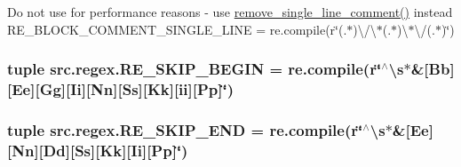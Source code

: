 Do not use for performance reasons -\/ use \hyperlink{namespacesrc_1_1utils_aeb934e59b76906b5837a00557f0ef750}{remove\-\_\-single\-\_\-line\-\_\-comment()} instead R\-E\-\_\-\-B\-L\-O\-C\-K\-\_\-\-C\-O\-M\-M\-E\-N\-T\-\_\-\-S\-I\-N\-G\-L\-E\-\_\-\-L\-I\-N\-E = re.\-compile(r\char`\"{}(.$\ast$)\textbackslash{}/\textbackslash{}$\ast$(.$\ast$)\textbackslash{}$\ast$\textbackslash{}/(.$\ast$)\char`\"{}) 

\hypertarget{namespacesrc_1_1regex_a607f21c9159f5e50832b5c458cce7c80}{
\subsubsection[{R\-E\-\_\-\-S\-K\-I\-P\-\_\-\-B\-E\-G\-I\-N}]{\setlength{\rightskip}{0pt plus 5cm}tuple src.\-regex.\-R\-E\-\_\-\-S\-K\-I\-P\-\_\-\-B\-E\-G\-I\-N = re.\-compile(r\char`\"{}$^\wedge$\textbackslash{}s$\ast$\&\mbox{[}Bb\mbox{]}\mbox{[}Ee\mbox{]}\mbox{[}Gg\mbox{]}\mbox{[}Ii\mbox{]}\mbox{[}Nn\mbox{]}\mbox{[}Ss\mbox{]}\mbox{[}Kk\mbox{]}\mbox{[}ii\mbox{]}\mbox{[}Pp\mbox{]}\char`\"{})}}\label{namespacesrc_1_1regex_a607f21c9159f5e50832b5c458cce7c80}
\hypertarget{namespacesrc_1_1regex_a431bcb21f8201e11fbae1619163b269b}{
\subsubsection[{R\-E\-\_\-\-S\-K\-I\-P\-\_\-\-E\-N\-D}]{\setlength{\rightskip}{0pt plus 5cm}tuple src.\-regex.\-R\-E\-\_\-\-S\-K\-I\-P\-\_\-\-E\-N\-D = re.\-compile(r\char`\"{}$^\wedge$\textbackslash{}s$\ast$\&\mbox{[}Ee\mbox{]}\mbox{[}Nn\mbox{]}\mbox{[}Dd\mbox{]}\mbox{[}Ss\mbox{]}\mbox{[}Kk\mbox{]}\mbox{[}Ii\mbox{]}\mbox{[}Pp\mbox{]}\char`\"{})}}\label{namespacesrc_1_1regex_a431bcb21f8201e11fbae1619163b269b}

